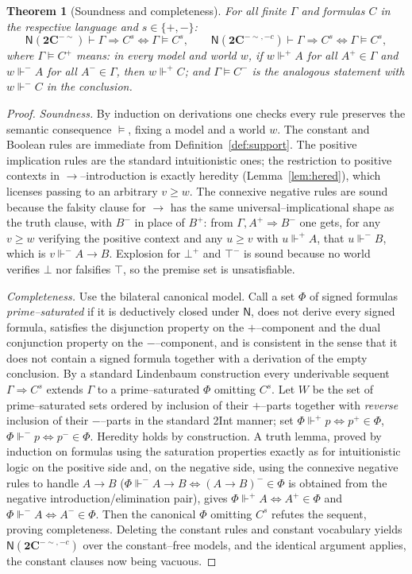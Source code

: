 \documentclass{amsart}
\theoremstyle{plain}
\newtheorem{theorem}{Theorem}
\theoremstyle{definition}
\newcommand{\To}{\rightarrow}
\newcommand{\Ci}{\mathbf{2C}^{-{\sim}}}        %
\newcommand{\Cii}{\mathbf{2C}^{-{\sim},-c}}    %
\newcommand{\fp}{\Vdash^{+}}
\newcommand{\fm}{\Vdash^{-}}
\begin{document}
\begin{theorem}[Soundness and completeness]\label{thm:sc}
For all finite $\Gamma$ and formulas $C$ in the respective language and
$s\in\{+,-\}$:
\[
\mathsf{N}(\Ci)\vdash \Gamma\Rightarrow C^{s}
\iff \Gamma\models C^{s},
\qquad
\mathsf{N}(\Cii)\vdash \Gamma\Rightarrow C^{s}
\iff \Gamma\models C^{s},
\]
where $\Gamma\models C^{+}$ means: in every model and world $w$, if $w\fp A$ for
all $A^{+}\in\Gamma$ and $w\fm A$ for all $A^{-}\in\Gamma$, then $w\fp C$; and
$\Gamma\models C^{-}$ is the analogous statement with $w\fm C$ in the conclusion.
\end{theorem}
\begin{proof}
\emph{Soundness.} By induction on derivations one checks every rule preserves the
semantic consequence $\models$, fixing a model and a world $w$. The constant and
Boolean rules are immediate from Definition~\ref{def:support}. The positive
implication rules are the standard intuitionistic ones; the restriction to
positive contexts in $\To$--introduction is exactly heredity
(Lemma~\ref{lem:hered}), which licenses passing to an arbitrary $v\ge w$. The
connexive negative rules are sound because the falsity clause for $\To$ has the
same universal--implicational shape as the truth clause, with $B^{-}$ in place of
$B^{+}$: from $\Gamma,A^{+}\Rightarrow B^{-}$ one gets, for any $v\ge w$
verifying the positive context and any $u\ge v$ with $u\fp A$, that $u\fm B$,
which is $v\fm A\To B$. Explosion for $\bot^{+}$ and $\top^{-}$ is sound because
no world verifies $\bot$ nor falsifies $\top$, so the premise set is
unsatisfiable.

\emph{Completeness.} Use the bilateral canonical model. Call a set $\Phi$ of
signed formulas \emph{prime--saturated} if it is deductively closed under
$\mathsf{N}$, does not derive every signed formula, satisfies the disjunction
property on the $+$--component and the dual conjunction property on the
$-$--component, and is consistent in the sense that it does not contain a signed
formula together with a derivation of the empty conclusion. By a standard
Lindenbaum construction every underivable sequent $\Gamma\Rightarrow C^{s}$
extends $\Gamma$ to a prime--saturated $\Phi$ omitting $C^{s}$. Let $W$ be the set
of prime--saturated sets ordered by inclusion of their $+$--parts together with
\emph{reverse} inclusion of their $-$--parts in the standard 2Int manner; set
$\Phi\fp p\iff p^{+}\in\Phi$, $\Phi\fm p\iff p^{-}\in\Phi$. Heredity holds by
construction. A truth lemma, proved by induction on formulas using the
saturation properties exactly as for intuitionistic logic on the positive side
and, on the negative side, using the connexive negative rules to handle $A\To B$
($\Phi\fm A\To B\iff(A\To B)^{-}\in\Phi$ is obtained from the negative
introduction/elimination pair), gives $\Phi\fp A\iff A^{+}\in\Phi$ and
$\Phi\fm A\iff A^{-}\in\Phi$. Then the canonical $\Phi$ omitting $C^{s}$
refutes the sequent, proving completeness. Deleting the constant rules and
constant vocabulary yields $\mathsf{N}(\Cii)$ over the constant--free models,
and the identical argument applies, the constant clauses now being vacuous.
\end{proof}
\end{document}
